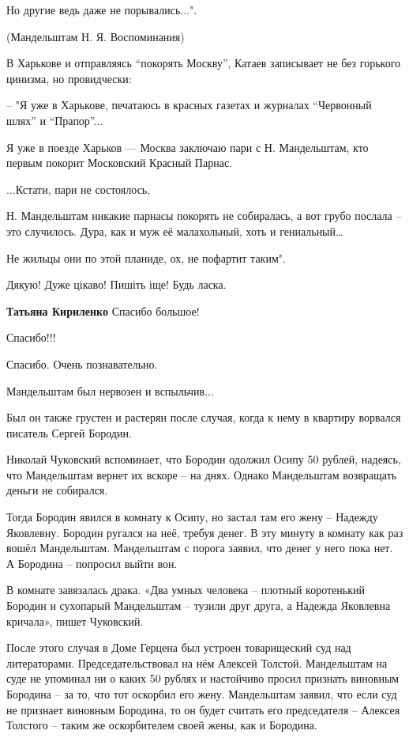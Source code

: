 \begin{itemize}
Но другие ведь даже не порывались...".

(Мандельштам Н. Я. Воспоминания)


В Харькове и отправляясь \enquote{покорять Москву}, Катаев записывает не без горького
цинизма, но провидчески:

– "Я уже в Харькове, печатаюсь в красных газетах и журналах \enquote{Червонный шлях} и \enquote{Прапор}...

Я уже в поезде Харьков — Москва заключаю пари с Н. Мандельштам, кто первым
покорит Московский Красный Парнас.

...Кстати, пари не состоялось,

Н. Мандельштам никакие парнасы покорять не собиралась, а вот грубо послала –
это случилось. Дура, как и муж её малахольный, хоть и гениальный…

Не жильцы они по этой планиде, ох, не пофартит таким".

Дякую! Дуже цікаво! Пишіть іще! Будь ласка.

\textbf{Татьяна Кириленко} Спасибо большое!

Спасибо!!!

Спасибо. Очень познавательно.


Мандельштам был нервозен и вспыльчив...

Был он также грустен и растерян после случая, когда к нему в квартиру ворвался
писатель Сергей Бородин.

Николай Чуковский вспоминает, что Бородин одолжил Осипу 50 рублей, надеясь, что
Мандельштам вернет их вскоре – на днях. Однако Мандельштам возвращать деньги не
собирался.

Тогда Бородин явился в комнату к Осипу, но застал там его жену – Надежду
Яковлевну. Бородин ругался на неё, требуя денег. В эту минуту в комнату как раз
вошёл Мандельштам. Мандельштам с порога заявил, что денег у него пока нет. А
Бородина – попросил выйти вон.

В комнате завязалась драка. «Два умных человека – плотный коротенький Бородин и
сухопарый Мандельштам – тузили друг друга, а Надежда Яковлевна кричала», пишет
Чуковский.

После этого случая в Доме Герцена был устроен товарищеский суд над
литераторами. Председательствовал на нём Алексей Толстой. Мандельштам на суде
не упоминал ни о каких 50 рублях и настойчиво просил признать виновным Бородина
– за то, что тот оскорбил его жену. Мандельштам заявил, что если суд не
признает виновным Бородина, то он будет считать его председателя – Алексея
Толстого – таким же оскорбителем своей жены, как и Бородина.


\end{itemize}
